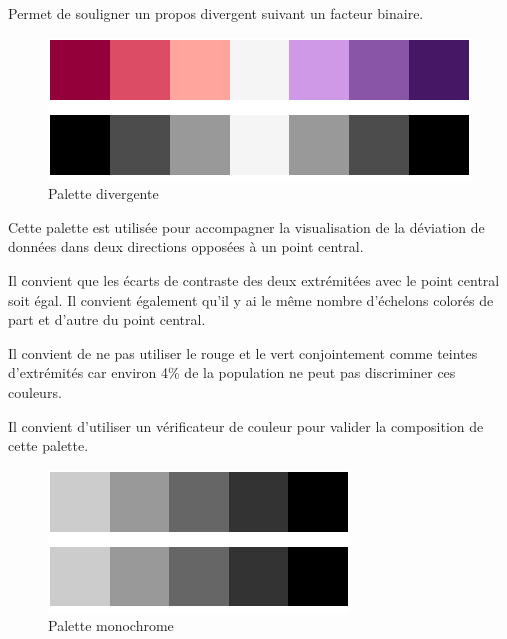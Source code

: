 \documentclass[a4paper,12pt]{article}
\begin{document}
\begin{multicols}{2}
Permet de souligner un propos divergent suivant un facteur binaire.\autocite{jonathanschwabishDevelopingDataVisualization2021} 

\begin{figure}[H]
\centering
\includegraphics[width=.9\linewidth]{./img/palette-divergente.pdf}
\caption{\label{fig:org514284e}Palette divergente}
\end{figure}

Cette palette est utilisée pour accompagner la visualisation de la déviation de données dans deux directions opposées à un point central. \autocite{wilkeColorScales2019}

Il convient que les écarts de contraste des deux extrémitées avec le point central soit égal. Il convient également qu'il y ai le même nombre d'échelons colorés de part et d'autre du point central. \autocite{wilkeColorScales2019}

Il convient de ne pas utiliser le rouge et le vert conjointement comme teintes d'extrémités car environ 4\% de la population ne peut pas discriminer ces couleurs. \autocite{schwabishCenteringAccessibilityData2022a}

Il convient d'utiliser un vérificateur de couleur pour valider la composition de cette palette.\autocite{andreaskrauseBestPracticesData2024}

\begin{figure}[H]
\centering
\includegraphics[width=.9\linewidth]{./img/palette-monochrome.pdf}
\caption{\label{fig:orgd75bf98}Palette monochrome}
\end{figure}


\end{multicols}
\end{document}
